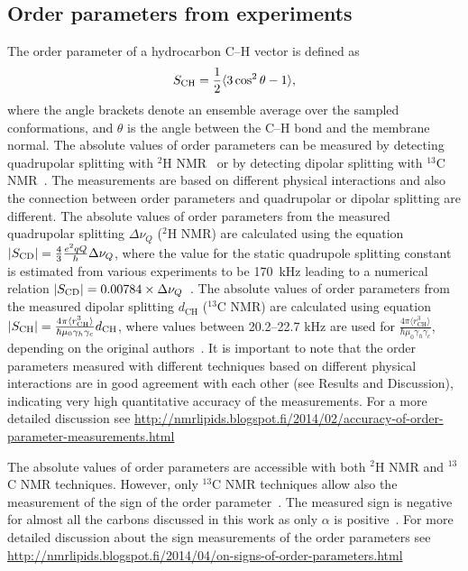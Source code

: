 \documentclass[journal=jacsat,manuscript=article]{achemso}
\begin{document}
\subsection{Order parameters from experiments}\label{expORDp}
The order parameter of a hydrocarbon C--H vector is defined as 
\begin{equation}\label{orderP}
S_{{\rm CH}}=\frac{1}{2}\langle 3 \cos^2 \theta-1 \rangle,
\end{equation} 
where the angle brackets denote an ensemble average over the sampled conformations, and $\theta$ is the angle between the C--H bond and the membrane normal.
The absolute values of order parameters can be measured by detecting quadrupolar splitting with $^2$H NMR~\cite{seelig77c} or by detecting dipolar 
splitting with $^{13}$C NMR~\cite{hong95a,gross97,dvinskikh05a,ferreira13}. The measurements are based on
different physical interactions and also the connection between order parameters and quadrupolar or dipolar splitting
are different. The absolute values of order parameters from the measured quadrupolar splitting $\Delta \nu_Q$ ($^2$H NMR) are calculated using 
the equation $|S_{{\rm CD}}|=\frac{4}{3} \frac{e^2qQ}{h} \Delta \nu_Q$, where the value for the static quadrupole
splitting constant is estimated from various experiments to be 170~kHz leading to a numerical relation $|S_{{\rm CD}}|=0.00784 \times \Delta \nu_Q$~\cite{seelig77c}. 
The absolute values of order parameters from the measured dipolar splitting $d_\mathrm{CH}$ ($^{13}$C NMR) are calculated using equation
$|S_{{\rm CH}}|=\frac{4\pi\langle r_\mathrm{CH}^3 \rangle}{\hbar \mu_0 \gamma_h \gamma_c} d_\mathrm{CH}$, where
values between 20.2--22.7 kHz are used for $\frac{4\pi\langle r_\mathrm{CH}^3 \rangle}{\hbar \mu_0 \gamma_h \gamma_c}$,
depending on the original authors~\cite{hong95a,gross97,dvinskikh05a,ferreira13}.
It is important to note that the order parameters measured with different techniques based on different physical interactions are in good agreement
with each other (see Results and Discussion), indicating very high quantitative accuracy of the measurements.
For a more detailed discussion see \url{http://nmrlipids.blogspot.fi/2014/02/accuracy-of-order-parameter-measurements.html}

The absolute values of order parameters are accessible with both $^2$H NMR and $^{13}$C NMR techniques. 
However, only $^{13}$C NMR techniques allow also the measurement of the sign of the order parameter~\cite{hong95a,hong95b,gross97}. 
The measured sign is negative for almost all the carbons discussed in this work as only $\alpha$ is positive~\cite{hong95a,hong95b,gross97}. 
For more detailed discussion about the sign measurements of the order parameters see \url{http://nmrlipids.blogspot.fi/2014/04/on-signs-of-order-parameters.html}
\end{document}
